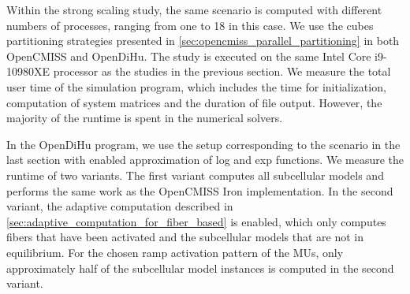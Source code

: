 Within the strong scaling study, the same scenario is computed with different numbers of processes, ranging from one to 18 in this case. We use the cubes partitioning strategies presented in \cref{sec:opencmiss_parallel_partitioning} in both OpenCMISS and OpenDiHu.
The study is executed on the same Intel Core i9-10980XE processor as the studies in the previous section.
We measure the total user time of the simulation program, which includes the time for initialization, computation of system matrices and the duration of file output. However, the majority of the runtime is spent in the numerical solvers.

In the OpenDiHu program, we use the setup corresponding to the  scenario in the last section with enabled approximation of log and exp functions. We measure the runtime of two variants. The first variant computes all subcellular models and performs the same work as the OpenCMISS Iron implementation. In the second variant, the adaptive computation described in \cref{sec:adaptive_computation_for_fiber_based} is enabled, which only computes fibers that have been activated and the subcellular models that are not in equilibrium. For the chosen ramp activation pattern of the MUs, only approximately half of the subcellular model instances is computed in the second variant.

